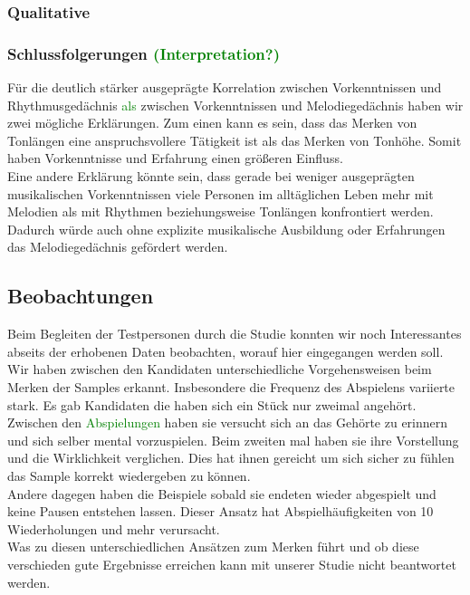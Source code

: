 \documentclass{acm_proc_article-sp}
\begin{document}
\subsubsection{Qualitative}
\subsubsection{Schlussfolgerungen \textcolor{green}{(Interpretation?)}}
Für die deutlich stärker ausgeprägte Korrelation zwischen Vorkenntnissen und Rhythmusgedächnis \textcolor{green}{als} zwischen Vorkenntnissen und Melodiegedächnis haben wir zwei mögliche Erklärungen. Zum einen kann es sein, dass das Merken von Tonlängen eine anspruchsvollere Tätigkeit ist als das Merken von Tonhöhe. Somit haben Vorkenntnisse und Erfahrung einen größeren Einfluss. \\
Eine andere Erklärung könnte sein, dass gerade bei weniger ausgeprägten musikalischen Vorkenntnissen viele Personen im alltäglichen Leben mehr mit Melodien als mit Rhythmen beziehungsweise Tonlängen konfrontiert werden. Dadurch würde auch ohne explizite musikalische Ausbildung oder Erfahrungen das Melodiegedächnis gefördert werden.\\
\subsection{Beobachtungen}
Beim Begleiten der Testpersonen durch die Studie konnten wir noch Interessantes abseits der erhobenen Daten beobachten, worauf hier eingegangen werden soll.\\

Wir haben zwischen den Kandidaten unterschiedliche Vorgehensweisen beim Merken der Samples erkannt. Insbesondere die Frequenz des Abspielens variierte stark. Es gab Kandidaten die haben sich ein Stück nur zweimal angehört. Zwischen den \textcolor{green}{Abspielungen} haben sie versucht sich an das Gehörte zu erinnern und sich selber mental vorzuspielen. Beim zweiten mal haben sie ihre Vorstellung und die Wirklichkeit verglichen. Dies hat ihnen gereicht um sich sicher zu fühlen das Sample korrekt wiedergeben zu können.\\
Andere dagegen haben die Beispiele sobald sie endeten wieder abgespielt und keine Pausen entstehen lassen. Dieser Ansatz hat Abspielhäufigkeiten von 10 Wiederholungen und mehr verursacht.\\ 
Was zu diesen unterschiedlichen Ansätzen zum Merken führt und ob diese verschieden gute Ergebnisse erreichen kann mit unserer Studie nicht beantwortet werden.\\
\end{document}

